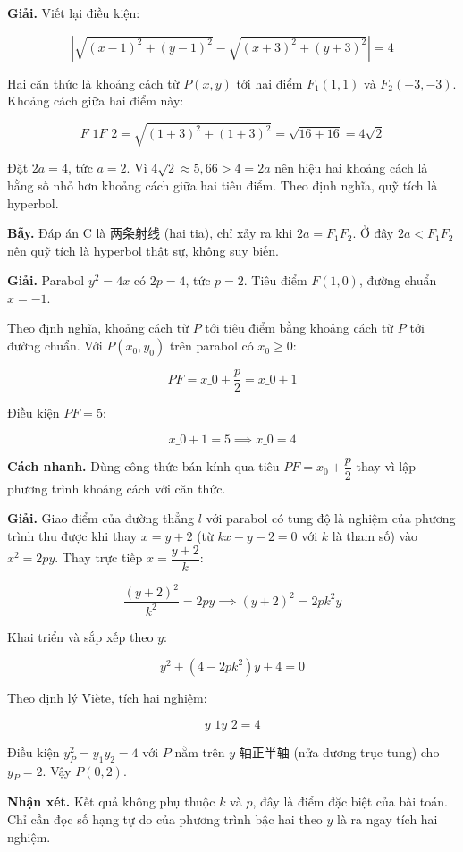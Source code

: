 \documentclass[11pt, a4paper]{article}
\begin{document}
\begin{dapan}[13 — Đáp án B]
\textbf{Giải.} Viết lại điều kiện:

$$\left| \sqrt{(x-1)^2 + (y-1)^2} - \sqrt{(x+3)^2 + (y+3)^2} \right| = 4$$

Hai căn thức là khoảng cách từ $P(x, y)$ tới hai điểm $F_1(1, 1)$ và $F_2(-3, -3)$. Khoảng cách giữa hai điểm này:

$$F\_1F\_2 = \sqrt{(1+3)^2 + (1+3)^2} = \sqrt{16 + 16} = 4\sqrt{2}$$

Đặt $2a = 4$, tức $a = 2$. Vì $4\sqrt{2} \approx 5{,}66 > 4 = 2a$ nên hiệu hai khoảng cách là hằng số nhỏ hơn khoảng cách giữa hai tiêu điểm. Theo định nghĩa, quỹ tích là hyperbol.

\textbf{Bẫy.} Đáp án C là 两条射线 (hai tia), chỉ xảy ra khi $2a = F_1F_2$. Ở đây $2a < F_1F_2$ nên quỹ tích là hyperbol thật sự, không suy biến.
\end{dapan}

\begin{dapan}[14 — Đáp án D]
\textbf{Giải.} Parabol $y^2 = 4x$ có $2p = 4$, tức $p = 2$. Tiêu điểm $F(1, 0)$, đường chuẩn $x = -1$.

Theo định nghĩa, khoảng cách từ $P$ tới tiêu điểm bằng khoảng cách từ $P$ tới đường chuẩn. Với $P(x_0, y_0)$ trên parabol có $x_0 \ge 0$:

$$PF = x\_0 + \frac{p}{2} = x\_0 + 1$$

Điều kiện $PF = 5$:

$$x\_0 + 1 = 5 \implies x\_0 = 4$$

\textbf{Cách nhanh.} Dùng công thức bán kính qua tiêu $PF = x_0 + \dfrac{p}{2}$ thay vì lập phương trình khoảng cách với căn thức.
\end{dapan}

\begin{dapan}[15 — Đáp án C]
\textbf{Giải.} Giao điểm của đường thẳng $l$ với parabol có tung độ là nghiệm của phương trình thu được khi thay $x = y + 2$ (từ $kx - y - 2 = 0$ với $k$ là tham số) vào $x^2 = 2py$. Thay trực tiếp $x = \dfrac{y+2}{k}$:

$$\frac{(y+2)^2}{k^2} = 2py \implies (y+2)^2 = 2pk^2 y$$

Khai triển và sắp xếp theo $y$:

$$y^2 + (4 - 2pk^2)y + 4 = 0$$

Theo định lý Viète, tích hai nghiệm:

$$y\_1 y\_2 = 4$$

Điều kiện $y_P^2 = y_1 y_2 = 4$ với $P$ nằm trên $y$ 轴正半轴 (nửa dương trục tung) cho $y_P = 2$. Vậy $P(0, 2)$.

\textbf{Nhận xét.} Kết quả không phụ thuộc $k$ và $p$, đây là điểm đặc biệt của bài toán. Chỉ cần đọc số hạng tự do của phương trình bậc hai theo $y$ là ra ngay tích hai nghiệm.
\end{dapan}
\end{document}
